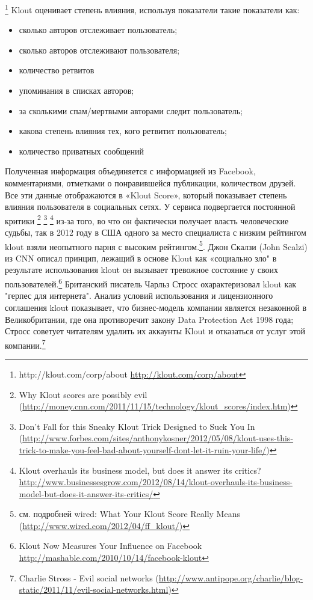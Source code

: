 \begin{itemize}
\footnote{http://klout.com/corp/about \url{http://klout.com/corp/about}}
 Klout оценивает степень влияния, используя показатели такие показатели как:
	\begin{itemize}
	\item сколько авторов отслеживает пользователь;
	\item сколько авторов отслеживают пользователя;
	\item количество ретвитов
	\item упоминания в списках авторов;
	\item за сколькими спам/мертвыми авторами следит пользователь;
	\item какова степень влияния тех, кого ретвитит пользователь;
	\item количество приватных сообщений
	\end{itemize}
Полученная информация объединяется с информацией из Facebook, комментариями, отметками о понравившейся публикации, количеством друзей. Все эти данные отображаются в «Klout Score», который показывает степень влияния пользователя в социальных сетях.
У сервиса подвергается постоянной критики \footnote{Why Klout scores are possibly evil (\url {http://money.cnn.com/2011/11/15/technology/klout_scores/index.htm})}
\footnote{Don't Fall for this Sneaky Klout Trick Designed to Suck You In (\url{http://www.forbes.com/sites/anthonykosner/2012/05/08/klout-uses-this-trick-to-make-you-feel-bad-about-yourself-dont-let-it-ruin-your-life/})}
\footnote{Klout overhauls its business model, but does it answer its critics? \url{http://www.businessesgrow.com/2012/08/14/klout-overhauls-its-business-model-but-does-it-answer-its-critics/}}
 из-за того, во что он фактически получает власть человеческие судьбы, так в 2012 году в США одного за место специалиста с низким рейтингом klout взяли неопытного парня с высоким рейтингом.\footnote{см. подробней wired: What Your Klout Score Really Means (\url{http://www.wired.com/2012/04/ff_klout/})}. Джон Скалзи (John Scalzi) из CNN описал принцип, лежащий в основе Klout как «социально зло" в результате использования klout он вызывает тревожное состояние у своих пользователей.\footnote{Klout Now Measures Your Influence on Facebook \url {http://mashable.com/2010/10/14/facebook-klout}}
 Британский писатель Чарльз Стросс охарактеризовал klout как "герпес для интернета". Анализ условий использования и лицензионного соглашения klout показывает, что бизнес-модель компании является незаконной в Великобритании, где она противоречит закону  Data Protection Act 1998 года; Стросс советует читателям удалить их аккаунты Klout и отказаться от услуг этой компании.\footnote{Charlie Stross - Evil social networks (\url {http://www.antipope.org/charlie/blog-static/2011/11/evil-social-networks.html})}

\end{itemize}
